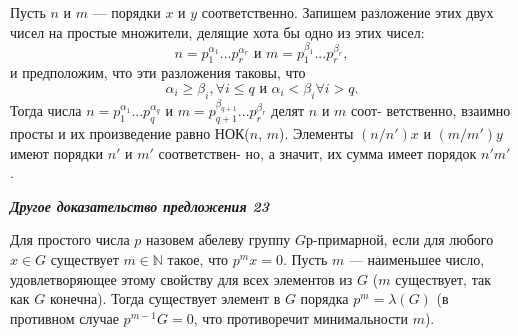 \begin{myproof}
Пусть $n$ и $m$ — порядки $x$ и $y$ соответственно. Запишем разложение\linebreak
этих двух чисел на простые множители, делящие хота бы одно из\linebreak
этих чисел:
$$n=p_1^{\alpha_1}...p_r^{\alpha_r} \text{ и } m = p_1^{\beta_1}...p_r^{\beta_r},$$
и предположим, что эти разложения таковы, что
$$\alpha_i \ge \beta_i, \forall i \le q \text{ и } \alpha_i < \beta_i  \forall i > q.$$
Тогда числа $n=p_1^{\alpha_1}...p_q^{\alpha_q} \text{ и } m = p_{q+1}^{\beta_{q+1}}...p_r^{\beta_r}$ делят $n$ и $m$ соот­-\linebreak
ветственно, взаимно просты и их произведение равно НОК($n$, $m$).\linebreak
Элементы $(n/n')x$ и $(m/m')y$ имеют порядки $n'$ и $m'$ соответствен-\linebreak
но, а значит, их сумма имеет порядок $n'm'$.
\end{myproof}
\textbf{\textit{Другое доказательство предложения 23}}

Для простого числа $p$ назовем абелеву группу $G р$-примарной, если\linebreak
для любого $x \in G$ существует $m \in \mathbb{N}$ такое, что $p^mx= 0$. Пусть $m$ —\linebreak
наименьшее число, удовлетворяющее этому свойству для всех элементов\linebreak
из $G$ ($m$ существует, так как $G$ конечна). Тогда существует элемент в $G$\linebreak
порядка $p^m = \lambda(G)$ (в противном случае $p^{m - 1} G = 0$, что противоречит\linebreak
минимальности $m$).

